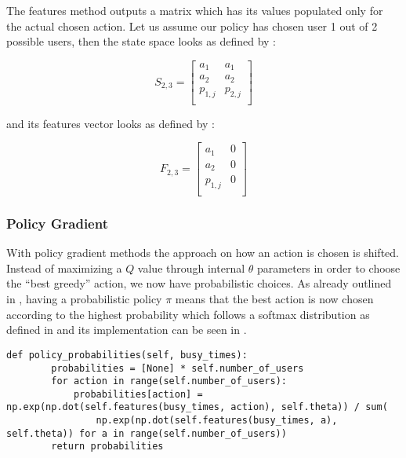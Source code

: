 \documentclass{seal_thesis}
\begin{document}
The features method outputs a matrix which has its values populated only for the actual chosen action. Let us assume our policy has chosen user 1 out of 2 possible users, then the state space looks as defined by :

\begin{equation}
\label{eq:kbatch_sp_ex}
	S_{2,3} = 
	\begin{bmatrix}
	a_1 & a_1 \\
	a_2 & a_2 \\
	p_{1,j} & p_{2,j} \\
	\end{bmatrix}
\end{equation}

and its features vector looks as defined by :

\begin{equation}
\label{eq:kbatch_features_ex}
	F_{2,3} = 
	\begin{bmatrix}
	a_1 & 0 \\
	a_2 & 0 \\
	p_{1,j} & 0 \\
	\end{bmatrix}
\end{equation}

\subsubsection{Policy Gradient}

With policy gradient methods the approach on how an action is chosen is shifted. Instead of maximizing a $Q$ value through internal $\theta$ parameters in order to choose the ``best greedy'' action, we now have probabilistic choices. As already outlined in , having a probabilistic policy $\pi$ means that the best action is now chosen according to the highest probability which follows a softmax distribution as defined in  and its implementation can be seen in .

\begin{lstlisting}[caption=Softmax distribution of preferences probabilities,label=lst:softmax_probabilities,style=CustomPython]
    def policy_probabilities(self, busy_times):
        probabilities = [None] * self.number_of_users
        for action in range(self.number_of_users):
            probabilities[action] = np.exp(np.dot(self.features(busy_times, action), self.theta)) / sum(
                np.exp(np.dot(self.features(busy_times, a), self.theta)) for a in range(self.number_of_users))
        return probabilities
\end{lstlisting}
\end{document}
